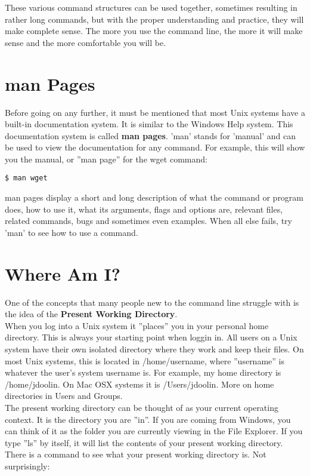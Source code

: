 These various command structures can be used together, sometimes resulting in rather long commands, but with the proper understanding and practice, they will make complete sense.  The more you use the command line, the more it will make sense and the more comfortable you will be.

\section{man Pages}

Before going on any further, it must be mentioned that most Unix systems have a built-in documentation system.  It is similar to the Windows Help system.  This documentation system is called \textbf{man pages}.  'man' stands for 'manual' and can be used to view the documentation for any command.  For example, this will show you the manual, or ''man page'' for the wget command:

\begin{verbatim}
$ man wget
\end{verbatim}

man pages display a short and long description of what the command or program does, how to use it, what its arguments, flags and options are, relevant files, related commands, bugs and sometimes even examples.  When all else fails, try 'man' to see how to use a command.

\section{Where Am I?}

One of the concepts that many people new to the command line struggle with is the idea of the \textbf{Present Working Directory}.\\

When you log into a Unix system it ''places'' you in your personal home directory.  This is always your starting point when loggin in.  All users on a Unix system have their own isolated directory where they work and keep their files.  On most Unix systems, this is located in /home/username, where ''username'' is whatever the user's system username is.  For example, my home directory is /home/jdoolin.  On Mac OSX systems it is /Users/jdoolin.  More on home directories in Users and Groups.\\

The present working directory can be thought of as your current operating context.  It is the directory you are ''in''.  If you are coming from Windows, you can think of it as the folder you are currently viewing in the File Explorer.  If you type ''ls'' by itself, it will list the contents of your present working directory.  There is a command to see what your present working directory is.  Not surprisingly:

